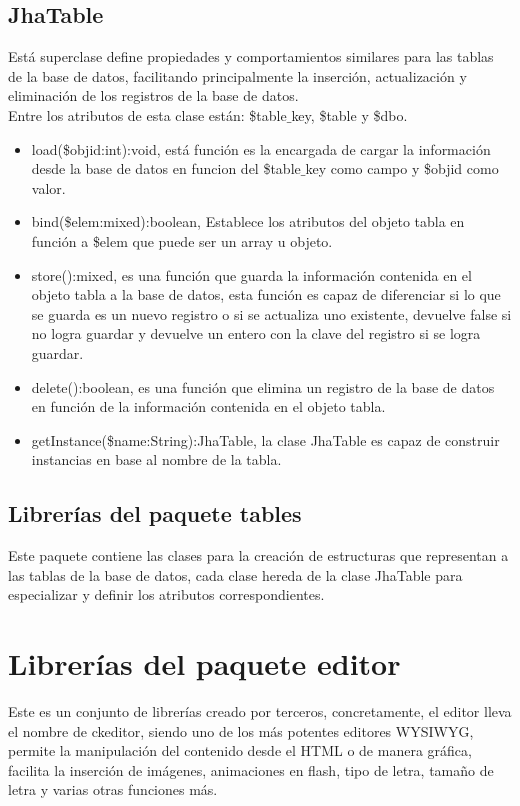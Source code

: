 \subsection{JhaTable}
Est\'a superclase define propiedades y comportamientos similares para las tablas de la base de datos, facilitando principalmente la inserci\'on, actualizaci\'on y eliminaci\'on de los registros de la base de datos.\\
Entre los atributos de esta clase est\'an: \textsf{\$table$\_$key}, \textsf{\$table} y \textsf{\$dbo}.
\begin{itemize}
\item \textsf{load(\$objid:int):void}, est\'a funci\'on es la encargada de cargar la informaci\'on desde la base de datos en funcion del \textsf{\$table$\_$key} como campo y \textsf{\$objid} como valor.
\item \textsf{bind(\$elem:mixed):boolean}, Establece los atributos del objeto tabla en funci\'on a \textsf{\$elem} que puede ser un array u objeto.
\item \textsf{store():mixed}, es una funci\'on que guarda la informaci\'on contenida en el objeto tabla a la base de datos, esta funci\'on es capaz de diferenciar si lo que se guarda es un nuevo registro o si se actualiza uno existente, devuelve false si no logra guardar y devuelve un entero con la clave del registro si se logra guardar.
\item \textsf{delete():boolean}, es una funci\'on que elimina un registro de la base de datos en funci\'on de la informaci\'on contenida en el objeto tabla.
\item \textsf{getInstance(\$name:String):JhaTable}, la clase JhaTable es capaz de construir instancias en base al nombre de la tabla.
\end{itemize}

\subsection{Librer\'ias del paquete \textsf{tables}}
Este paquete contiene las clases para la creaci\'on de estructuras que representan a las tablas de la base de datos, cada clase hereda de la clase JhaTable para especializar y definir los atributos correspondientes.

\section{Librer\'ias del paquete \textsf{editor}}
Este es un conjunto de librer\'ias creado por terceros, concretamente, el editor lleva el nombre de ckeditor, siendo uno de los m\'as potentes editores WYSIWYG, permite la manipulaci\'on del contenido desde el HTML o de manera gr\'afica, facilita la inserci\'on de im\'agenes, animaciones en flash, tipo de letra, tama\~no de letra y varias otras funciones m\'as.

